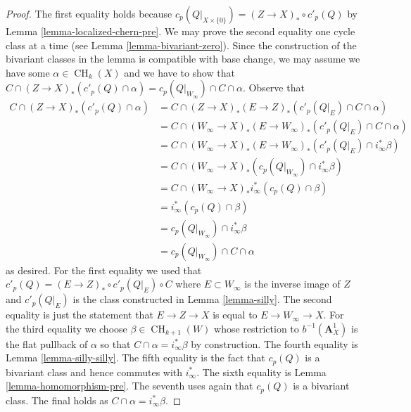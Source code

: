 \documentclass[10pt,a4paper]{amsart}
\theoremstyle{plain}
\theoremstyle{definition}
\theoremstyle{remark}
\numberwithin{equation}{subsection}
\def\CH{\mathop{\mathrm{CH}}\nolimits}
\begin{document}
\begin{proof}
The first equality holds because $c_p(Q|_{X \times \{0\}}) =
(Z \to X)_* \circ c'_p(Q)$ by Lemma \ref{lemma-localized-chern-pre}.
We may prove the second equality one cycle class at a time
(see Lemma \ref{lemma-bivariant-zero}). Since the construction of
the bivariant classes in the lemma is compatible with base change,
we may assume we have some $\alpha \in \CH_k(X)$ and we have to show that
$C \cap (Z \to X)_*(c'_p(Q) \cap \alpha) =
c_p(Q|_{W_\infty}) \cap C \cap \alpha$. Observe that
\begin{align*}
C \cap (Z \to X)_*(c'_p(Q) \cap \alpha)
& =
C \cap (Z \to X)_* (E \to Z)_*(c'_p(Q|_E) \cap C \cap \alpha) \\
& =
C \cap (W_\infty \to X)_*(E \to W_\infty)_*(c'_p(Q|_E) \cap C \cap \alpha) \\
& =
C \cap (W_\infty \to X)_*(E \to W_\infty)_*(c'_p(Q|_E) \cap i_\infty^*\beta) \\
& =
C \cap (W_\infty \to X)_*(c_p(Q|_{W_\infty}) \cap i_\infty^*\beta) \\
& =
C \cap (W_\infty \to X)_*i_\infty^*(c_p(Q) \cap \beta) \\
& =
i_\infty^*(c_p(Q) \cap \beta) \\
& =
c_p(Q|_{W_\infty}) \cap i_\infty^*\beta \\
& =
c_p(Q|_{W_\infty}) \cap C \cap \alpha
\end{align*}
as desired. For the first equality we used that
$c'_p(Q) = (E \to Z)_* \circ c'_p(Q|_E) \circ C$ where $E \subset W_\infty$
is the inverse image of $Z$ and $c'_p(Q|_E)$ is the class constructed
in Lemma \ref{lemma-silly}. The second equality is just the statement
that $E \to Z \to X$ is equal to $E \to W_\infty \to X$.
For the third equality we choose $\beta \in \CH_{k + 1}(W)$ whose restriction to
$b^{-1}(\mathbf{A}^1_X)$ is the flat pullback of $\alpha$ so that
$C \cap \alpha = i_\infty^*\beta$ by construction. The fourth equality is
Lemma \ref{lemma-silly-silly}. The fifth equality is the fact that
$c_p(Q)$ is a bivariant class and hence commutes with $i_\infty^*$.
The sixth equality is Lemma \ref{lemma-homomorphism-pre}.
The seventh uses again that $c_p(Q)$ is a bivariant class.
The final holds as $C \cap \alpha = i_\infty^*\beta$.
\end{proof}
\end{document}
